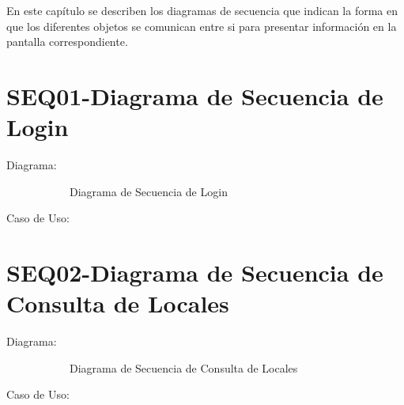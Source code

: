 En este capítulo se describen los diagramas de secuencia que indican la forma en que los diferentes objetos se comunican entre si para presentar información en la pantalla correspondiente.

\section{SEQ01-Diagrama de Secuencia de Login}
\begin{description}
	\item[Diagrama:]\hspace{1pt}
	\begin{figure}[hbtp!]
		\begin{center}
			\caption{Diagrama de Secuencia de Login}
			\label{fig:SEQ01}
		\end{center}
	\end{figure}
	
	\item[Caso de Uso:]

\end{description}



\section{SEQ02-Diagrama de Secuencia de Consulta de Locales}

\begin{description} 
	\item[Diagrama:]\hspace{1pt}
	\begin{figure}[hbtp!]
		\begin{center}
			\caption{Diagrama de Secuencia de Consulta de Locales}
			\label{fig:SEQ02}
		\end{center}
	\end{figure}
	
	\item[Caso de Uso:]
\end{description}